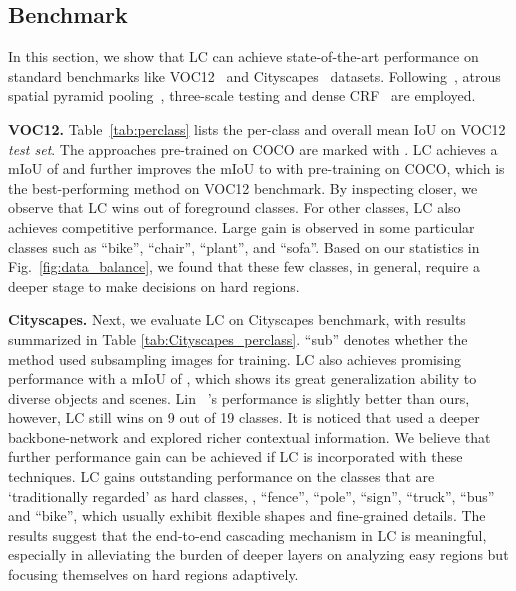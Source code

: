 \documentclass[10pt,twocolumn,letterpaper]{article}
\begin{document}
\subsection{Benchmark}

In this section, we show that LC can achieve state-of-the-art performance on standard benchmarks like VOC12~\cite{everingham2010pascal} and Cityscapes~\cite{Cordts2016Cityscapes} datasets. 
Following~\cite{CP2016Deeplab}, atrous spatial pyramid pooling~\cite{CP2016Deeplab}, three-scale testing and dense CRF~\cite{koltun2011efficient} are employed.

\noindent
\textbf{VOC12.}
Table~\ref{tab:perclass} lists the per-class and overall mean IoU on VOC12 \textit{test set}.
The approaches pre-trained on COCO \cite{lin2014microsoft} are marked with .
LC achieves a mIoU of  and further improves the mIoU to  with pre-training on COCO, which is the best-performing method on VOC12 benchmark.
By inspecting closer, we observe that LC wins  out of  foreground classes. For other  classes, LC also achieves competitive performance. Large gain is observed in some particular classes such as ``bike'', ``chair'', ``plant'', and ``sofa''. Based on our statistics in Fig.~\ref{fig:data_balance}, we found that these few classes, in general, require a deeper stage to make decisions on hard regions. 







\noindent
\textbf{Cityscapes.}
Next, we evaluate LC on Cityscapes benchmark, with results summarized in Table \ref{tab:Cityscapes_perclass}.
``sub'' denotes whether the method used subsampling images for training.
LC also achieves promising performance with a mIoU of , which shows its great generalization ability to diverse objects and scenes.
Lin \etal~\cite{lin2015efficient}'s performance is slightly better than ours, however, LC still wins on 9 out of 19 classes. It is noticed that \cite{lin2015efficient} used a deeper backbone-network and explored richer contextual information. We believe that further performance gain can be achieved if LC is incorporated with these techniques.
LC gains outstanding performance on the classes that are `traditionally regarded' as hard classes, \eg, ``fence'', ``pole'', ``sign'', ``truck'', ``bus'' and ``bike'', which usually exhibit flexible shapes and fine-grained details.
The results suggest that the end-to-end cascading mechanism in LC is meaningful, especially in alleviating the burden of deeper layers on analyzing easy regions but focusing themselves on hard regions adaptively.
\end{document}

